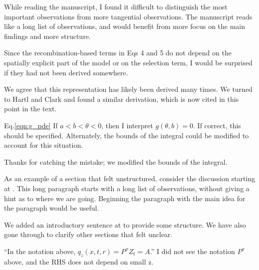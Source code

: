 \begin{point}{}
    While reading the manuscript, I found it difficult to distinguish the most important observations from more tangential observations. The manuscript reads like a long list of observations, and would benefit from more focus on the main findings and more structure.
\end{point}

\reply
{}

\begin{point}{}
Since the recombination-based terms in Eqs 4 and 5 do not depend on the spatially explicit part of the model or on the selection term, I would be surprised if they had not been derived somewhere.
\end{point}

\reply
We agree that this representation has likely been derived many times. 
We turned to Hartl and Clark and found a similar derivation, which is now cited in this point in the text.

\begin{point}{Eq.\ref{eqn:g_pde}}
If $a<b<\theta<0$, then I interpret $g(\theta,b) = 0$. If correct, this should be specified.  Alternately, the bounds of the integral could be modified to account for this situation.
\end{point}

\reply
Thanks for catching the mistake; we modified the bounds of the integral.

\begin{point}{}
As an example of a section that felt unstructured, consider the discussion starting at \revref.  This long paragraph starts with a long list of observations, without giving a hint as to where we are going. Beginning the paragraph with the main idea for the paragraph would be useful.
\end{point}

\reply
{}
We added an introductory sentence at \revref to provide some structure. 
We have also gone through to clarify other sections that felt unclear.

\begin{point}{\revref}
``In the notation above, $q_z(x, t, r) = P^x{Z_t = A}$.''
I did not see the notation $P^x$ above, and the RHS does not depend on small z.
\end{point}

